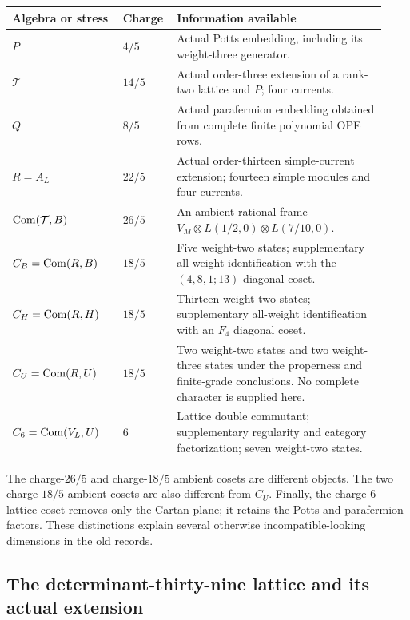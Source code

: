 \begin{longtable}{@{}p{0.28\linewidth}p{0.12\linewidth}p{0.53\linewidth}@{}}
\toprule
Algebra or stress&Charge&Information available\\
\midrule\endhead
$P$&$4/5$&Actual Potts embedding, including its weight-three generator.\\
$\mathcal T$&$14/5$&Actual order-three extension of a rank-two lattice
and $P$; four currents.\\
$Q$&$8/5$&Actual parafermion embedding obtained from complete finite
polynomial OPE rows.\\
$R=A_L$&$22/5$&Actual order-thirteen simple-current extension;
fourteen simple modules and four currents.\\
$\operatorname{Com}(\mathcal T,B)$&$26/5$&An ambient rational frame
$V_M\otimes L(1/2,0)\otimes L(7/10,0)$.\\
$C_B=\operatorname{Com}(R,B)$&$18/5$&Five weight-two states; supplementary
all-weight identification with the $(4,8,1;13)$ diagonal coset.\\
$C_H=\operatorname{Com}(R,H)$&$18/5$&Thirteen weight-two states; supplementary
all-weight identification with an $F_4$ diagonal coset.\\
$C_U=\operatorname{Com}(R,U)$&$18/5$&Two weight-two states and two weight-three
states under the properness and finite-grade conclusions. No complete
character is supplied here.\\
$C_6=\operatorname{Com}(V_L,U)$&$6$&Lattice double commutant; supplementary
regularity and category factorization; seven weight-two states.\\
\bottomrule
\end{longtable}

The charge-$26/5$ and charge-$18/5$ ambient cosets are different
objects. The two charge-$18/5$ ambient cosets are also different from
$C_U$. Finally, the charge-$6$ lattice coset removes only the Cartan
plane; it retains the Potts and parafermion factors. These distinctions
explain several otherwise incompatible-looking dimensions in the old
records.

\subsection{The determinant-thirty-nine lattice and its actual extension}
\label{expstructure:lattice-core}

